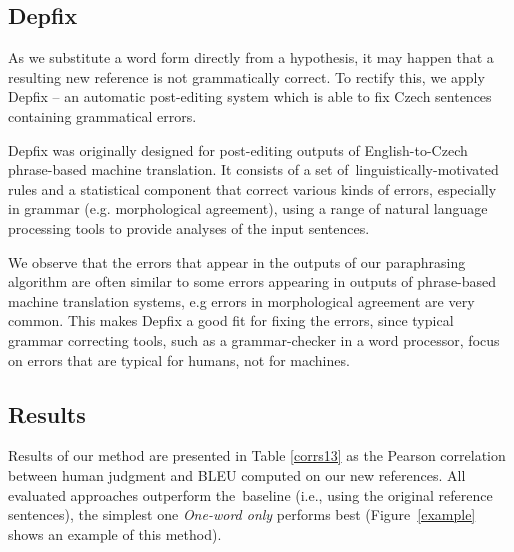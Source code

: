 \documentclass[11pt]{article}
\def\Fref#1{Figure~\ref{#1}}
\begin{document}
\subsection{Depfix}
As we substitute a word form directly from a hypothesis, it may happen that a 
resulting new reference is not grammatically correct. To rectify this, we apply
Depfix \cite{depfix} -- an automatic post-editing system which is able to fix 
Czech sentences containing grammatical errors.

Depfix was originally designed for post-editing outputs of English-to-Czech 
phrase-based machine translation. It consists of a set of~linguistically-motivated 
rules and a statistical component that correct various kinds of errors, especially 
in grammar (e.g. morphological agreement), using a range of natural language 
processing tools to provide analyses of the input sentences.

We observe that the errors that appear in the outputs of our paraphrasing 
algorithm are often similar to some errors appearing in outputs of phrase-based
machine translation systems, e.g errors in morphological agreement are very 
common. This makes Depfix a good fit for fixing the errors, since typical 
grammar correcting tools, such as a grammar-checker in a word processor, focus
on errors that are typical for humans, not for machines. 

\subsection{Results}
Results of our method are presented in Table \ref{corrs13} as the Pearson 
correlation between human judgment and BLEU computed on our new references. 
All evaluated approaches outperform the~baseline (i.e., using the original 
reference sentences), the simplest one \textit{One-word only} performs 
best (\Fref{example} shows an example of this method).
\end{document}
